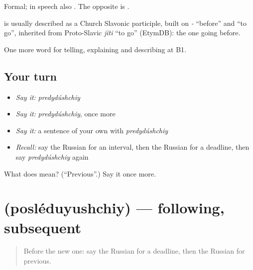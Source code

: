 Formal; in speech also \emph{}. The opposite is \emph{}.

\begin{cousinweb}
\emph{} is usually described as a Church Slavonic participle, built on \emph{-} \textquotedblleft{}before\textquotedblright{} and \emph{} \textquotedblleft{}to go\textquotedblright{}, inherited from Proto-Slavic \emph{jĭti} \textquotedblleft{}to go\textquotedblright{} (EtymDB): the one going before.
\end{cousinweb}

\begin{grammarlens}[title={What you've built}]
One more word for telling, explaining and describing at B1.
\end{grammarlens}

\subsection*{Your turn}
\begin{itemize}
\raggedright
  \item \emph{Say it:} \emph{predydúshchiy}
  \item \emph{Say it:} \emph{predydúshchiy}, once more
  \item \emph{Say it:} a sentence of your own with \emph{predydúshchiy}
  \item \emph{Recall:} say the Russian for an interval, then the Russian for a deadline, then say \emph{predydúshchiy} again
\end{itemize}

\begin{tcolorbox}[breakable,colback=teal!4,colframe=teal!35!black,title={Before you move on}]
What does  mean? (\textquotedblleft{}Previous\textquotedblright{}.) Say it once more.
\end{tcolorbox}
\section[\texorpdfstring{\ru{последующий} (posléduyushchiy)}{последующий (posléduyushchiy)}]{ (posléduyushchiy) — following, subsequent}

\label{lesson:RU-C277-posleduyushchiy}



\begin{quote}
Before the new one: say the Russian for a deadline, then the Russian for previous.
\end{quote}

